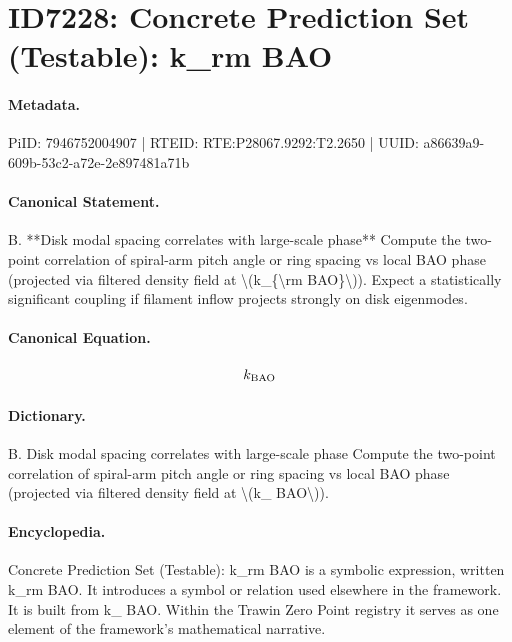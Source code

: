 \section*{ID7228: Concrete Prediction Set (Testable): k\_rm BAO}
\paragraph{Metadata.}
PiID: 7946752004907 | RTEID: RTE:P28067.9292:T2.2650 | UUID: a86639a9-609b-53c2-a72e-2e897481a71b

\paragraph{Canonical Statement.}
B. **Disk modal spacing correlates with large-scale phase** Compute the two-point correlation of spiral-arm pitch angle or ring spacing vs local BAO phase (projected via filtered density field at \textbackslash{}(k\_\{\textbackslash{}rm BAO\}\textbackslash{})). Expect a statistically significant coupling if filament inflow projects strongly on disk eigenmodes.

\paragraph{Canonical Equation.}
\[
k_{\rm BAO}
\]

\paragraph{Dictionary.}
B. Disk modal spacing correlates with large-scale phase Compute the two-point correlation of spiral-arm pitch angle or ring spacing vs local BAO phase (projected via filtered density field at \textbackslash{}(k\_ BAO\textbackslash{})).

\paragraph{Encyclopedia.}
Concrete Prediction Set (Testable): k\_rm BAO is a symbolic expression, written k\_rm BAO. It introduces a symbol or relation used elsewhere in the framework. It is built from k\_ BAO. Within the Trawin Zero Point registry it serves as one element of the framework's mathematical narrative.
